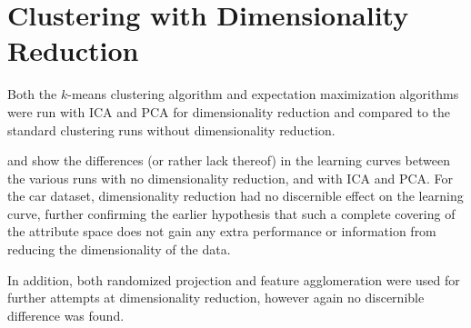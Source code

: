\documentclass{article}
\begin{document}
  \section{Clustering with Dimensionality Reduction}
    Both the $k$-means clustering algorithm and expectation maximization algorithms were run with ICA and PCA for dimensionality reduction and compared to the standard clustering runs without dimensionality reduction.

     and  show the differences (or rather lack thereof) in the learning curves between the various runs with no dimensionality reduction, and with ICA and PCA. For the car dataset, dimensionality reduction had no discernible effect on the learning curve, further confirming the earlier hypothesis that such a complete covering of the attribute space does not gain any extra performance or information from reducing the dimensionality of the data.

    In addition, both randomized projection and feature agglomeration were used for further attempts at dimensionality reduction, however again no discernible difference was found.
\end{document}
